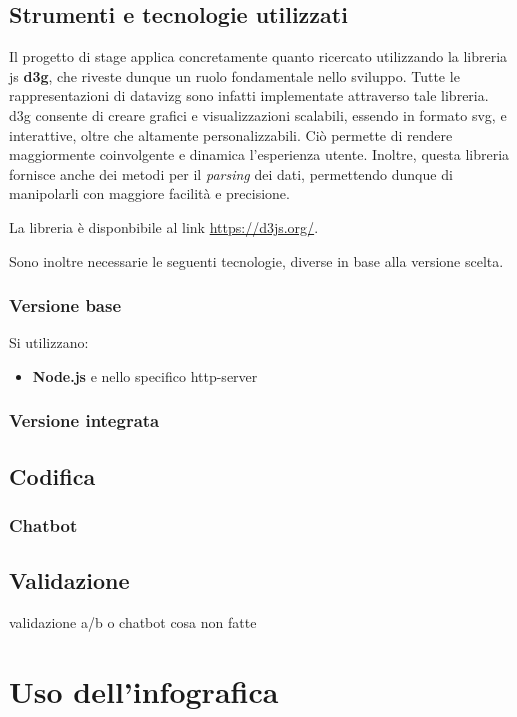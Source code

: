 \subsection{Strumenti e tecnologie utilizzati}\label{subsec:tecnologie}
Il progetto di stage applica concretamente quanto ricercato utilizzando la libreria \gls{js} \textbf{\gls{d3g}}, che riveste dunque un ruolo fondamentale nello sviluppo.
Tutte le rappresentazioni di \gls{datavizg} sono infatti implementate attraverso tale libreria.
\gls{d3g} consente di creare grafici e visualizzazioni scalabili, essendo in formato \gls{svg}, e interattive, oltre che altamente personalizzabili. 
Ciò permette di rendere maggiormente coinvolgente e dinamica l'esperienza utente. 
Inoltre, questa libreria fornisce anche dei metodi per il \emph{parsing} dei dati, permettendo dunque di manipolarli con maggiore facilità e precisione.

La libreria è disponbibile al link \href{https://d3js.org/}{https://d3js.org/}.

\bigskip
\noindent Sono inoltre necessarie le seguenti tecnologie, diverse in base alla versione scelta.

\subsubsection{Versione base}
Si utilizzano:
\begin{itemize}
    \item \textbf{Node.js} e nello specifico http-server
\end{itemize}

\subsubsection{Versione integrata}

\subsection{Codifica}

\subsubsection{Chatbot}\label{subsubsec:chatbot}


\subsection{Validazione}
validazione a/b o chatbot
cosa non fatte

\section{Uso dell'infografica}